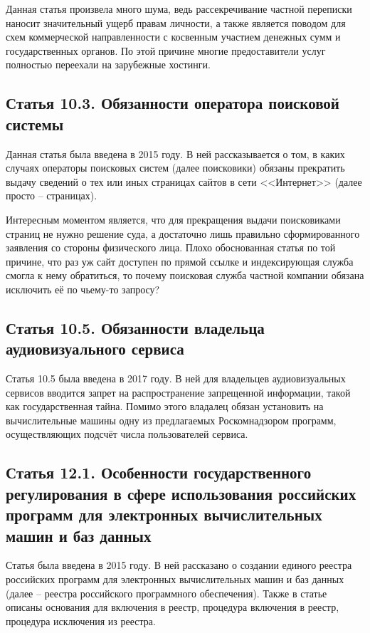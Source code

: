Данная статья произвела много шума, ведь рассекречивание частной переписки наносит значительный ущерб правам личности, а также является поводом для схем коммерческой направленности с косвенным участием денежных сумм и государственных органов. По этой причине многие предоставители услуг полностью переехали на зарубежные хостинги.

\subsection{Статья 10.3. Обязанности оператора поисковой системы}

Данная статья была введена в 2015 году. В ней рассказывается о том, в каких случаях операторы поисковых систем (далее поисковики) обязаны прекратить выдачу сведений о тех или иных страницах сайтов в сети <<Интернет>> (далее просто -- страницах). 


Интересным моментом является, что для прекращения выдачи поисковиками страниц не нужно решение суда, а достаточно лишь правильно сформированного заявления со стороны физического лица. Плохо обоснованная статья по той причине, что раз уж сайт доступен по прямой ссылке и индексирующая служба смогла к нему обратиться, то почему поисковая служба частной компании обязана исключить её по чьему-то запросу?


\subsection{Статья 10.5. Обязанности владельца аудиовизуального сервиса}

Статья 10.5 была введена в 2017 году. В ней для владельцев аудиовизуальных сервисов вводится запрет на распространение запрещенной информации, такой как государственная тайна. Помимо этого владалец обязан установить на вычислительные машины одну из предлагаемых Роскомнадзором программ, осуществляющих подсчёт числа пользователей сервиса.


\subsection{Статья 12.1. Особенности государственного регулирования в сфере использования российских программ для электронных вычислительных машин и баз данных}

Статья была введена в 2015 году. В ней рассказано о создании единого реестра российских программ для электронных вычислительных машин и баз данных (далее -- реестра российского программного обеспечения). Также в статье описаны основания для включения в реестр, процедура включения в реестр, процедура исключения из реестра.


